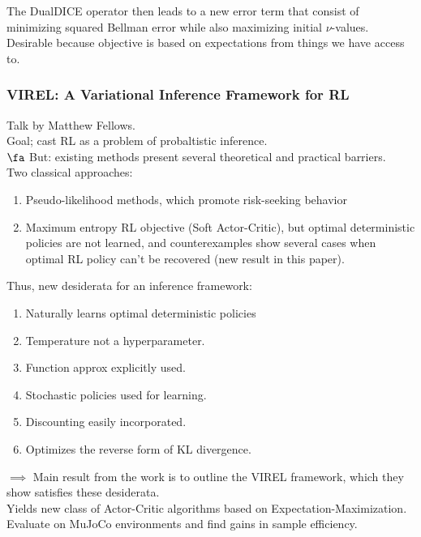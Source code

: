 The DualDICE operator then leads to a new error term that consist of minimizing squared Bellman error while also maximizing initial $\nu$-values. Desirable because objective is based on expectations from things we have access to.

\spacerule
\subsubsection{VIREL: A Variational Inference Framework for RL \cite{fellows2019virel}}

Talk by Matthew Fellows. \\

Goal; cast RL as a problem of probaltistic inference. \\

$\fa$ But: existing methods present several theoretical and practical barriers. \\

Two classical approaches:
\begin{enumerate}
    \item Pseudo-likelihood methods, which promote risk-seeking behavior
    \item Maximum entropy RL objective (Soft Actor-Critic), but optimal deterministic policies are not learned, and counterexamples show several cases when optimal RL policy can't be recovered (new result in this paper).
\end{enumerate}

Thus, new desiderata for an inference framework:
\begin{enumerate}
    \item Naturally learns optimal deterministic policies
    \item Temperature not a hyperparameter.
    \item Function approx explicitly used.
    \item Stochastic policies used for learning.
    \item Discounting easily incorporated.
    \item Optimizes the reverse form of KL divergence.
\end{enumerate}

$\implies$ Main result from the work is to outline the VIREL framework, which they show satisfies these desiderata. \\

Yields new class of Actor-Critic algorithms based on Expectation-Maximization. Evaluate on MuJoCo environments and find gains in sample efficiency.

